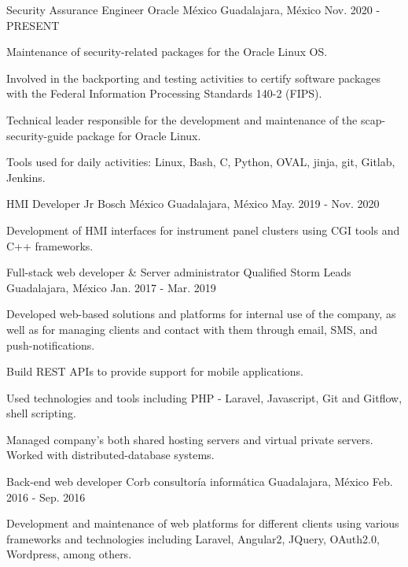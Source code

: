 \begin{cventries}
    \cventry
        {Security Assurance Engineer}
        {Oracle México}
        {Guadalajara, México}
        {Nov. 2020 - PRESENT}
        {
            \begin{cvitems}
                \item {Maintenance of security-related packages for the Oracle Linux OS.}
                \item {Involved in the backporting and testing activities to certify software packages with the Federal Information Processing Standards 140-2 (FIPS).}
                \item {Technical leader responsible for the development and maintenance of the scap-security-guide package for Oracle Linux.}
                \item {Tools used for daily activities: Linux, Bash, C, Python, OVAL, jinja, git, Gitlab, Jenkins.}
            \end{cvitems}
        }
    \cventry
        {HMI Developer Jr}
        {Bosch México}
        {Guadalajara, México}
        {May. 2019 - Nov. 2020}
        {
            \begin{cvitems}
                \item {Development of HMI interfaces for instrument panel clusters using CGI tools and C++ frameworks.}
            \end{cvitems}
        }
    \cventry
        {Full-stack web developer \& Server administrator}
        {Qualified Storm Leads}
        {Guadalajara, México}
        {Jan. 2017 - Mar. 2019}
        {
            \begin{cvitems}
                \item {Developed web-based solutions and platforms for internal use of the company, as well as for managing clients and contact with them through email, SMS, and push-notifications.}
                \item {Build REST APIs to provide support for mobile applications.}
                \item {Used technologies and tools including PHP - Laravel, Javascript, Git and Gitflow, shell scripting.}
                \item {Managed company's both shared hosting servers and virtual private servers. Worked with distributed-database systems.}
            \end{cvitems}
        }
    \cventry
        {Back-end web developer}
        {Corb consultoría informática}
        {Guadalajara, México}
        {Feb. 2016 - Sep. 2016}
        {
            \begin{cvitems}
                \item {Development and maintenance of web platforms for different clients using various frameworks and technologies including Laravel, Angular2, JQuery, OAuth2.0, Wordpress, among others.}
            \end{cvitems}
        }
\end{cventries}
